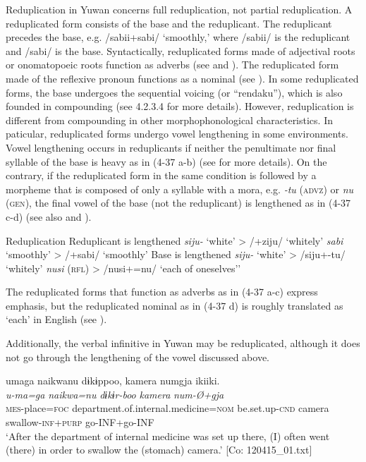 Reduplication in Yuwan concerns full reduplication, not partial reduplication. A reduplicated form consists of the base and the reduplicant. The reduplicant precedes the base, e.g. /sabii+sabi/ ‘smoothly,’ where /sabii/ is the reduplicant and /sabi/ is the base. Syntactically, reduplicated forms made of adjectival roots or onomatopoeic roots function as adverbs (see  and ). The reduplicated form made of the reflexive pronoun functions as a nominal (see ). In some reduplicated forms, the base undergoes the sequential voicing (or “rendaku”), which is also founded in compounding (see 4.2.3.4 for more details). However, reduplication is different from compounding in other morphophonological characteristics. In paticular, reduplicated forms undergo vowel lengthening in some environments. Vowel lengthening occurs in reduplicants if neither the penultimate nor final syllable of the base is heavy as in (4-37 a-b) (see  for more details). On the contrary, if the reduplicated form in the same condition is followed by a morpheme that is composed of only a syllable with a mora, e.g. \textit{{}-tu} (\textsc{advz}) or \textit{nu} (\textsc{gen}), the final vowel of the base (not the reduplicant) is lengthened as in (4-37 c-d) (see also  and ).

\ea  Reduplication \label{ex:4.37}
 Reduplicant is lengthened
  \ea  \textit{siju-}  ‘white’  >  /+ziju/  ‘whitely’
  \ex  \textit{sabi}  ‘smoothly’  >  /+sabi/  ‘smoothly’
 Base is lengthened
  \ex  \textit{siju-}  ‘white’  >  /siju+-tu/  ‘whitely’
  \ex  \textit{nusi}  (\textsc{rfl})  >  /nusi+=nu/  ‘each of oneselves’’
  \z
\z

The reduplicated forms that function as adverbs as in (4-37 a-c) express emphasis, but the reduplicated nominal as in (4-37 d) is roughly translated as ‘each’ in English (see ).

  Additionally, the verbal infinitive in Yuwan may be reduplicated, although it does not go through the lengthening of the vowel discussed above.

\ea  \label{ex:4.38}
\ea %
\glll    umaga  naikwanu  dɨkɨppoo,   {\textbar}kamera{\textbar}  numgja  ikiiki.\\
      \textit{u-ma=ga}  \textit{naikwa=nu}  \textit{dɨkɨr-boo}    \textit{kamera}  \textit{num-Ø+gja}  \textit{}\\
      \textsc{mes}-place=\textsc{foc}  department.of.internal.medicine=\textsc{nom}  be.set.up-\textsc{cnd}  camera  swallow-\textsc{inf}+\textsc{purp}  go-INF+go-INF      \\
      \glt       ‘After the department of internal medicine was set up there, (I) often went (there) in order to swallow the (stomach) camera.’ [Co: 120415\_01.txt]

